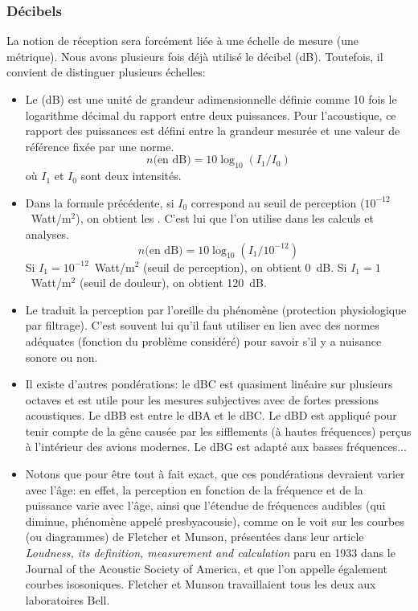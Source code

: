 \medskip
\subsubsection{Décibels}

La notion de réception sera forcément liée à une échelle de mesure (une métrique). Nous avons plusieurs fois déjà utilisé le décibel (dB). Toutefois, il convient de distinguer plusieurs échelles:
\begin{itemize}
   \item Le  (dB) est une unité de grandeur adimensionnelle définie comme 10 fois le logarithme décimal du rapport entre deux puissances. Pour l'acoustique, ce rapport des puissances est défini entre la grandeur mesurée et une valeur de référence fixée par une norme.
   \begin{equation}
   n \text{(en dB)} = 10 \log_{10} (I_1/I_0)
   \end{equation}
   où $I_1$ et $I_0$ sont deux intensités.
   
   \item Dans la formule précédente, si $I_0$ correspond au seuil de perception ($10^{-12}$~Watt/m$^2$), on obtient les . C'est lui que l'on utilise dans les calculs et analyses.
   \begin{equation}
   n \text{(en dB)} = 10 \log_{10} (I_1/10^{-12})
   \end{equation}
   Si $I_1 = 10^{-12}$~Watt/m$^2$ (seuil de perception), on obtient 0~dB.
   Si $I_1 = 1$~Watt/m$^2$ (seuil de douleur), on obtient 120~dB.

   \item Le  traduit la perception par l'oreille du phénomène (protection physiologique par filtrage). C'est souvent lui qu'il faut utiliser en lien avec des normes adéquates (fonction du problème considéré) pour savoir s'il y a nuisance sonore ou non.

   \item Il existe d'autres pondérations: le dBC est quasiment linéaire sur plusieurs octaves et est utile pour les mesures subjectives avec de fortes pressions acoustiques. Le dBB est entre le dBA et le dBC. Le dBD est appliqué pour tenir compte de la gêne causée par les sifflements (à hautes fréquences) perçus à l'intérieur des avions modernes. Le dBG est adapté aux basses fréquences...

  \item  Notons que pour être tout à fait exact, que ces pondérations devraient varier avec l'âge: en effet, la perception en fonction de la fréquence et de la puissance varie avec l'âge, ainsi que l'étendue de fréquences audibles (qui diminue, phénomène appelé presbyacousie), comme on le voit sur les courbes (ou diagrammes) de Fletcher et Munson, présentées dans leur article \emph{Loudness, its definition, measurement and calculation} paru en 1933 dans le Journal of the Acoustic Society of America, et que l'on appelle également courbes isosoniques. Fletcher et Munson travaillaient tous les deux aux laboratoires Bell. 
\end{itemize}

